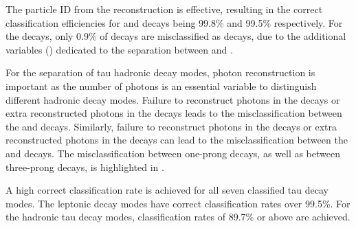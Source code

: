 The particle ID from the \pandora reconstruction is effective, resulting in the correct classification efficiencies for \tauToElectron and \tauToMuon decays being 99.8\% and 99.5\% respectively. For the \tauToPion decays, only 0.9\% of decays are misclassified as \tauToElectron decays, due to the additional variables () dedicated to the separation between \Pem and \Ppiminus.

For the separation of tau hadronic decay modes, photon reconstruction is important as the number of photons is an essential variable to distinguish different hadronic decay modes. Failure to reconstruct photons in the \tauToAiPhoton decays or extra reconstructed photons in the \tauToRho decays leads to the misclassification between the \tauToAiPhoton and \tauToRho decays. Similarly, failure to reconstruct photons in the \tauToRho decays or extra reconstructed photons in the \tauToPion decays can lead to the misclassification between the \tauToRho and \tauToPion decays. The misclassification between one-prong decays, as well as between three-prong decays, is highlighted in .

A high correct classification rate is achieved for all seven classified tau decay modes. The leptonic decay modes have correct classification rates over 99.5\%. For the hadronic tau decay modes, classification rates of 89.7\% or above are achieved.






